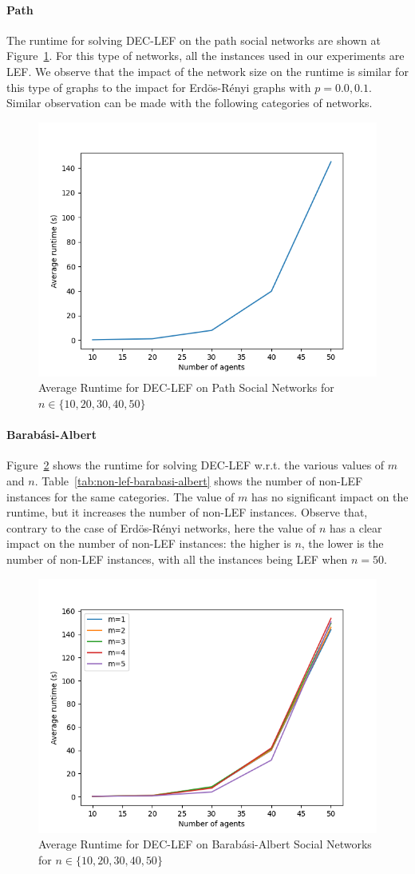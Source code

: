 \documentclass{article}
\begin{document}
\paragraph{Path} The runtime for solving DEC-LEF on the path social networks are shown at Figure~\ref{fig:runtime-path}. For this type of networks, all the instances used in our experiments are LEF. We observe that the impact of the network size on the runtime is similar for this type of graphs to the impact for Erd\"os-R\'enyi graphs with $p = 0.0, 0.1$. Similar observation can be made with the following categories of networks.

\begin{figure}[htb]
\centering
\includegraphics[width=0.45\linewidth]{results-runtime-path.png}
\caption{Average Runtime for DEC-LEF on Path Social Networks for $n \in \{10,20,30,40,50\}$\label{fig:runtime-path}}
\end{figure}

\paragraph{Barab\'asi-Albert} Figure~\ref{fig:runtime-barabasi-albert} shows the runtime for solving DEC-LEF w.r.t. the various values of  $m$ and $n$. Table~\ref{tab:non-lef-barabasi-albert} shows the number of non-LEF instances for the same categories. The value of $m$ has no significant impact on the runtime, but it increases the number of non-LEF instances. Observe that, contrary to the case of Erd\"os-R\'enyi networks, here the value of $n$ has a clear impact on the number of non-LEF instances: the higher is $n$, the lower is the number of non-LEF instances, with all the instances being LEF when $n=50$.

\begin{figure}[htb]
\centering
\includegraphics[width=0.45\linewidth]{results-runtime-BA.png}
\caption{Average Runtime for DEC-LEF on Barab\'asi-Albert Social Networks for $n \in \{10,20,30,40,50\}$\label{fig:runtime-barabasi-albert}}
\end{figure}
\end{document}
